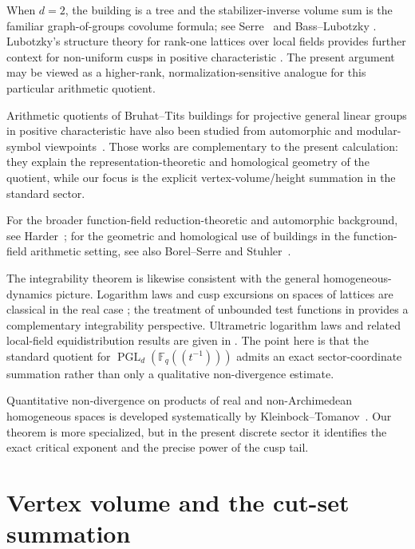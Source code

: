 \documentclass[11pt]{amsart}
\newcommand{\Fq}{\mathbb F_q}
\newcommand{\PGL}{\operatorname{PGL}}
\theoremstyle{plain}
\theoremstyle{definition}
\numberwithin{equation}{section}
\begin{document}
When \(d=2\), the building is a tree and the stabilizer-inverse volume sum is the familiar
graph-of-groups covolume formula; see Serre~\cite{Serre} and Bass--Lubotzky
\cite{BassLubotzky}.  Lubotzky's structure theory for rank-one lattices over local fields
provides further context for non-uniform cusps in positive characteristic
\cite{LubotzkyRankOne}.  The present argument may be viewed as a higher-rank,
normalization-sensitive analogue for this particular arithmetic quotient.


Arithmetic quotients of Bruhat--Tits buildings for projective general linear groups in
positive characteristic have also been studied from automorphic and modular-symbol
viewpoints~\cite{KondoYasuda}.  Those works are complementary to the present calculation: they explain the
representation-theoretic and homological geometry of the quotient, while our focus is the
explicit vertex-volume/height summation in the standard sector.


For the broader function-field reduction-theoretic and automorphic background, see
Harder~\cite{HarderReduction,HarderChevalley}; for the geometric and homological use of
buildings in the function-field arithmetic setting, see also Borel--Serre and
Stuhler~\cite{BorelSerre,Stuhler}.


The integrability theorem is likewise consistent with the general homogeneous-dynamics
picture.  Logarithm laws and cusp excursions on spaces of lattices are classical in the
real case \cite{KleinbockMargulis}; the treatment of unbounded test functions in
\cite{KleinbockShiWeiss} provides a complementary integrability perspective.  Ultrametric
logarithm laws and related local-field equidistribution results are given in
\cite{AthreyaGhoshPrasadI,AthreyaGhoshPrasadII,KwonLim}.  The point here is that the
standard quotient for $\PGL_d(\Fq(\!(t^{-1})\!))$ admits an exact
sector-coordinate summation rather than only a qualitative non-divergence estimate.

Quantitative non-divergence on products of real and non-Archimedean homogeneous spaces is
developed systematically by Kleinbock--Tomanov~\cite{KleinbockTomanov}.  Our theorem is
more specialized, but in the present discrete sector it identifies the exact critical
exponent and the precise power of the cusp tail.


\section{Vertex volume and the cut-set summation}
\end{document}
